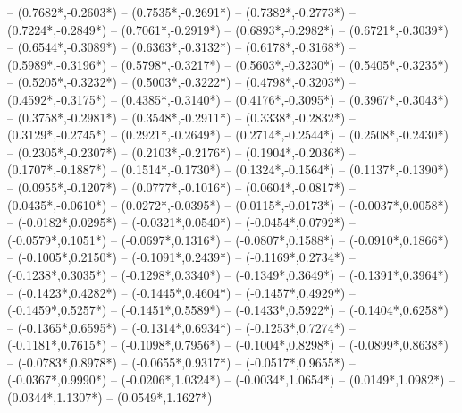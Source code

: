{	-- ({0.7682*\dx},{-0.2603*\dy})
	-- ({0.7535*\dx},{-0.2691*\dy})
	-- ({0.7382*\dx},{-0.2773*\dy})
	-- ({0.7224*\dx},{-0.2849*\dy})
	-- ({0.7061*\dx},{-0.2919*\dy})
	-- ({0.6893*\dx},{-0.2982*\dy})
	-- ({0.6721*\dx},{-0.3039*\dy})
	-- ({0.6544*\dx},{-0.3089*\dy})
	-- ({0.6363*\dx},{-0.3132*\dy})
	-- ({0.6178*\dx},{-0.3168*\dy})
	-- ({0.5989*\dx},{-0.3196*\dy})
	-- ({0.5798*\dx},{-0.3217*\dy})
	-- ({0.5603*\dx},{-0.3230*\dy})
	-- ({0.5405*\dx},{-0.3235*\dy})
	-- ({0.5205*\dx},{-0.3232*\dy})
	-- ({0.5003*\dx},{-0.3222*\dy})
	-- ({0.4798*\dx},{-0.3203*\dy})
	-- ({0.4592*\dx},{-0.3175*\dy})
	-- ({0.4385*\dx},{-0.3140*\dy})
	-- ({0.4176*\dx},{-0.3095*\dy})
	-- ({0.3967*\dx},{-0.3043*\dy})
	-- ({0.3758*\dx},{-0.2981*\dy})
	-- ({0.3548*\dx},{-0.2911*\dy})
	-- ({0.3338*\dx},{-0.2832*\dy})
	-- ({0.3129*\dx},{-0.2745*\dy})
	-- ({0.2921*\dx},{-0.2649*\dy})
	-- ({0.2714*\dx},{-0.2544*\dy})
	-- ({0.2508*\dx},{-0.2430*\dy})
	-- ({0.2305*\dx},{-0.2307*\dy})
	-- ({0.2103*\dx},{-0.2176*\dy})
	-- ({0.1904*\dx},{-0.2036*\dy})
	-- ({0.1707*\dx},{-0.1887*\dy})
	-- ({0.1514*\dx},{-0.1730*\dy})
	-- ({0.1324*\dx},{-0.1564*\dy})
	-- ({0.1137*\dx},{-0.1390*\dy})
	-- ({0.0955*\dx},{-0.1207*\dy})
	-- ({0.0777*\dx},{-0.1016*\dy})
	-- ({0.0604*\dx},{-0.0817*\dy})
	-- ({0.0435*\dx},{-0.0610*\dy})
	-- ({0.0272*\dx},{-0.0395*\dy})
	-- ({0.0115*\dx},{-0.0173*\dy})
	-- ({-0.0037*\dx},{0.0058*\dy})
	-- ({-0.0182*\dx},{0.0295*\dy})
	-- ({-0.0321*\dx},{0.0540*\dy})
	-- ({-0.0454*\dx},{0.0792*\dy})
	-- ({-0.0579*\dx},{0.1051*\dy})
	-- ({-0.0697*\dx},{0.1316*\dy})
	-- ({-0.0807*\dx},{0.1588*\dy})
	-- ({-0.0910*\dx},{0.1866*\dy})
	-- ({-0.1005*\dx},{0.2150*\dy})
	-- ({-0.1091*\dx},{0.2439*\dy})
	-- ({-0.1169*\dx},{0.2734*\dy})
	-- ({-0.1238*\dx},{0.3035*\dy})
	-- ({-0.1298*\dx},{0.3340*\dy})
	-- ({-0.1349*\dx},{0.3649*\dy})
	-- ({-0.1391*\dx},{0.3964*\dy})
	-- ({-0.1423*\dx},{0.4282*\dy})
	-- ({-0.1445*\dx},{0.4604*\dy})
	-- ({-0.1457*\dx},{0.4929*\dy})
	-- ({-0.1459*\dx},{0.5257*\dy})
	-- ({-0.1451*\dx},{0.5589*\dy})
	-- ({-0.1433*\dx},{0.5922*\dy})
	-- ({-0.1404*\dx},{0.6258*\dy})
	-- ({-0.1365*\dx},{0.6595*\dy})
	-- ({-0.1314*\dx},{0.6934*\dy})
	-- ({-0.1253*\dx},{0.7274*\dy})
	-- ({-0.1181*\dx},{0.7615*\dy})
	-- ({-0.1098*\dx},{0.7956*\dy})
	-- ({-0.1004*\dx},{0.8298*\dy})
	-- ({-0.0899*\dx},{0.8638*\dy})
	-- ({-0.0783*\dx},{0.8978*\dy})
	-- ({-0.0655*\dx},{0.9317*\dy})
	-- ({-0.0517*\dx},{0.9655*\dy})
	-- ({-0.0367*\dx},{0.9990*\dy})
	-- ({-0.0206*\dx},{1.0324*\dy})
	-- ({-0.0034*\dx},{1.0654*\dy})
	-- ({0.0149*\dx},{1.0982*\dy})
	-- ({0.0344*\dx},{1.1307*\dy})
	-- ({0.0549*\dx},{1.1627*\dy})
}
